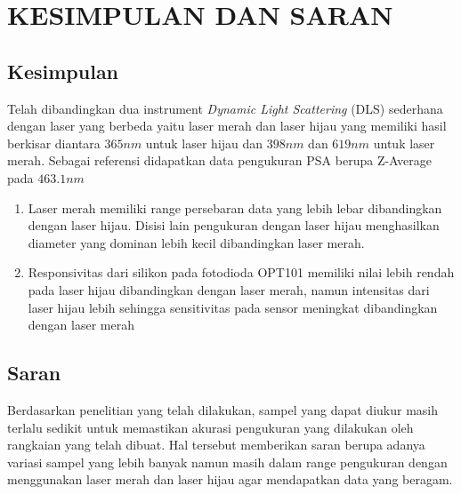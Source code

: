 \chapter{KESIMPULAN DAN SARAN}

\section{Kesimpulan}
Telah dibandingkan dua instrument \textit{Dynamic Light Scattering} (DLS) sederhana dengan
laser yang berbeda yaitu laser merah dan laser hijau yang memiliki hasil berkisar diantara
${365 nm}$ untuk laser hijau dan ${398 nm}$ dan ${619 nm}$ untuk laser merah.
Sebagai referensi didapatkan data pengukuran PSA berupa Z-Average pada ${463.1 nm}$
\begin{enumerate}
    \item Laser merah memiliki range persebaran data yang lebih lebar dibandingkan
    dengan laser hijau. Disisi lain pengukuran dengan laser hijau menghasilkan diameter yang
    dominan lebih kecil dibandingkan laser merah.
    \item Responsivitas dari silikon pada fotodioda OPT101 memiliki nilai lebih rendah
    pada laser hijau dibandingkan dengan laser merah, namun intensitas dari laser hijau lebih
    sehingga sensitivitas pada sensor meningkat dibandingkan dengan laser merah
\end{enumerate}


\section{Saran}
Berdasarkan penelitian yang telah dilakukan, sampel yang dapat diukur masih terlalu
sedikit untuk memastikan akurasi pengukuran yang dilakukan oleh rangkaian yang telah
dibuat. Hal tersebut memberikan saran berupa adanya variasi sampel yang lebih banyak
namun masih dalam range pengukuran dengan menggunakan laser merah dan laser hijau
agar mendapatkan data yang beragam.